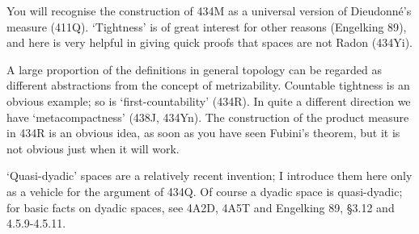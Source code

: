 {You will recognise the construction of 434M as a universal version of
Dieudonn\'e's measure (411Q).   `Tightness' is of great
interest for other reasons ({\smc Engelking 89}), and here is
very helpful in giving quick proofs that spaces are not Radon (434Yi).

A large proportion of the definitions in general topology can be
regarded as different abstractions from the concept of metrizability.
Countable tightness is an obvious example;  so is `first-countability'
(434R).   In quite a different direction we have `metacompactness'
(438J, 434Yn).   The construction of the product measure in 434R is an
obvious idea, as soon as you have seen Fubini's theorem, but it is not
obvious just when it will work.

`Quasi-dyadic' spaces are a relatively recent invention;  I introduce
them here only as a vehicle for the argument of 434Q.   Of course a
dyadic space is
quasi-dyadic;   for basic facts on dyadic spaces, see 4A2D, 4A5T and
{\smc Engelking 89}, \S3.12 and 4.5.9-4.5.11.
}%

\discrpage

